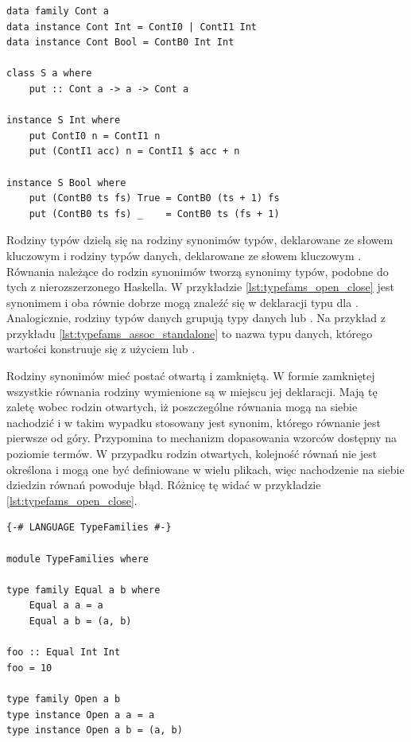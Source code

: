 {\begin{lstlisting}[float,label={lst:typefams_assoc_standalone},
                   caption={Przykład pozwiązanej z klasą i niezależnej rodziny typów.}]
data family Cont a
data instance Cont Int = ContI0 | ContI1 Int
data instance Cont Bool = ContB0 Int Int

class S a where
    put :: Cont a -> a -> Cont a

instance S Int where
    put ContI0 n = ContI1 n
    put (ContI1 acc) n = ContI1 $ acc + n

instance S Bool where
    put (ContB0 ts fs) True = ContB0 (ts + 1) fs
    put (ContB0 ts fs) _    = ContB0 ts (fs + 1)
\end{lstlisting}

Rodziny typów dzielą się na rodziny synonimów typów, deklarowane ze słowem
kluczowym  i rodziny typów danych, deklarowane ze słowem
kluczowym . Równania należące do rodzin synonimów tworzą synonimy typów,
podobne do tych z nierozszerzonego Haskella. W przykładzie \ref{lst:typefams_open_close}
 jest synonimem  i oba równie dobrze mogą znaleźć
się w deklaracji typu dla . Analogicznie, rodziny typów danych grupują
typy danych  lub . Na przykład  z przykładu
\ref{lst:typefams_assoc_standalone} to nazwa typu danych, którego wartości konstruuje się
z użyciem  lub .

Rodziny synonimów mieć postać otwartą i zamkniętą. W formie
zamkniętej wszystkie równania rodziny wymienione są w miejscu jej
deklaracji. Mają tę zaletę wobec rodzin otwartych, iż poszczególne równania mogą na
siebie nachodzić i w takim wypadku stosowany jest synonim, którego równanie jest
pierwsze od góry. Przypomina to mechanizm dopasowania wzorców dostępny na poziomie
termów. W przypadku rodzin otwartych, kolejność równań nie jest
określona i mogą one być definiowane w wielu plikach, więc nachodzenie na siebie
dziedzin równań powoduje błąd. Różnicę tę widać w przykładzie
\ref{lst:typefams_open_close}\cite{GuideTypeFamilies}.

\begin{lstlisting}[float,label={lst:typefams_open_close},
                   caption={Przykład otwartej i zamkniętej funkcji na typach z nachodzącymi na siebie dziedzinami.}]
{-# LANGUAGE TypeFamilies #-}

module TypeFamilies where

type family Equal a b where
    Equal a a = a
    Equal a b = (a, b)

foo :: Equal Int Int
foo = 10

type family Open a b
type instance Open a a = a
type instance Open a b = (a, b)


\end{lstlisting}}
